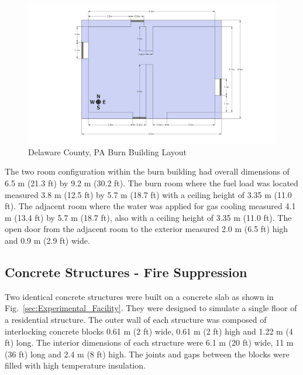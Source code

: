 \documentclass[12pt,oneside]{book}
\begin{document}
\begin{figure}[!ht]
	\includegraphics[width=6in]{../Figures/Pictures/DelCoBurnBuildingDimensions}
	\caption{Delaware County, PA Burn Building Layout}
	\label{fig:Delaware_County,_PA_Burn_Building_Layout}
\end{figure}

The two room configuration within the burn building had overall dimensions of 6.5 m (21.3 ft) by 9.2 m (30.2 ft). The burn room where the fuel load was located measured 3.8 m (12.5 ft) by 5.7 m (18.7 ft) with a ceiling height of 3.35 m (11.0 ft). The adjacent room where the water was applied for gas cooling measured 4.1 m (13.4 ft) by 5.7 m (18.7 ft), also with a ceiling height of 3.35 m (11.0 ft). The open door from the adjacent room to the exterior measured 2.0 m (6.5 ft) high and 0.9 m (2.9 ft) wide. 

\subsection{Concrete Structures - Fire Suppression}
\label{sec:Experimental Structures}

Two identical concrete structures were built on a concrete slab as shown in Fig.~\ref{sec:Experimental_Facility}. They were designed to simulate a single floor of a residential structure.  The outer wall of each structure was composed of interlocking concrete blocks 0.61 m (2 ft) wide, 0.61 m (2 ft) high and 1.22 m (4 ft) long.  The interior dimensions of each structure were 6.1 m (20 ft) wide, 11 m (36 ft) long and 2.4 m (8 ft) high.  The joints and gaps between the blocks were filled with high temperature insulation.
\end{document}
